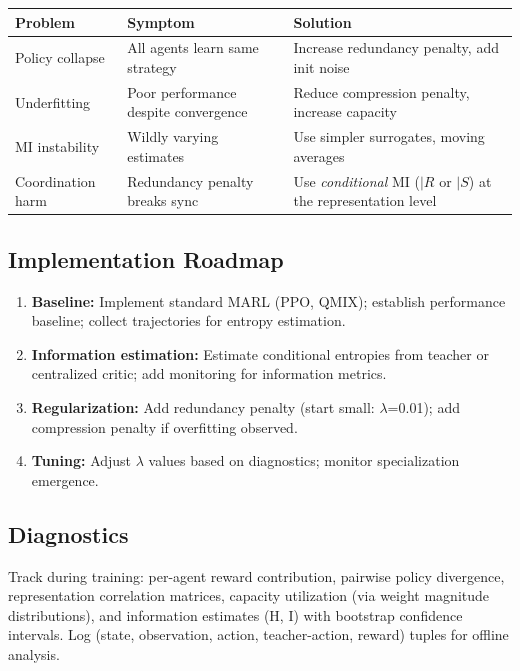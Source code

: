 \documentclass[10pt, letterpaper]{article}
\begin{document}
\begin{center}
\begin{tabular}{lll}
\toprule
\textbf{Problem} & \textbf{Symptom} & \textbf{Solution} \\
\midrule
Policy collapse & All agents learn same strategy & Increase redundancy penalty, add init noise \\
Underfitting & Poor performance despite convergence & Reduce compression penalty, increase capacity \\
MI instability & Wildly varying estimates & Use simpler surrogates, moving averages \\
Coordination harm & Redundancy penalty breaks sync & Use \emph{conditional} MI ($\mid R$ or $\mid S$) at the representation level \\
\bottomrule
\end{tabular}
\end{center}

\subsection{Implementation Roadmap}

\begin{enumerate}
    \item \textbf{Baseline:} Implement standard MARL (PPO, QMIX); establish performance baseline; collect trajectories for entropy estimation.
    \item \textbf{Information estimation:} Estimate conditional entropies from teacher or centralized critic; add monitoring for information metrics.
    \item \textbf{Regularization:} Add redundancy penalty (start small: $\lambda$=0.01); add compression penalty if overfitting observed.
    \item \textbf{Tuning:} Adjust $\lambda$ values based on diagnostics; monitor specialization emergence.
\end{enumerate}

\subsection{Diagnostics}

Track during training: per-agent reward contribution, pairwise policy divergence, representation correlation matrices, capacity utilization (via weight magnitude distributions), and information estimates (H, I) with bootstrap confidence intervals. Log (state, observation, action, teacher-action, reward) tuples for offline analysis.
\end{document}
